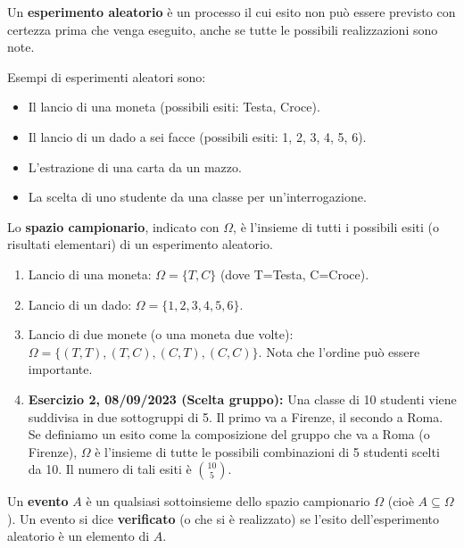 \documentclass[12pt,a4paper]{article}
\begin{document}
\begin{definition}
Un \textbf{esperimento aleatorio} è un processo il cui esito non può essere previsto con certezza prima che venga eseguito, anche se tutte le possibili realizzazioni sono note.
\end{definition}

\begin{example}
Esempi di esperimenti aleatori sono:
\begin{itemize}
    \item Il lancio di una moneta (possibili esiti: Testa, Croce).
    \item Il lancio di un dado a sei facce (possibili esiti: 1, 2, 3, 4, 5, 6).
    \item L'estrazione di una carta da un mazzo.
    \item La scelta di uno studente da una classe per un'interrogazione.
\end{itemize}
\end{example}

\begin{definition}
Lo \textbf{spazio campionario}, indicato con $\Omega$, è l'insieme di tutti i possibili esiti (o risultati elementari) di un esperimento aleatorio.
\end{definition}

\begin{example}
\begin{enumerate}
    \item Lancio di una moneta: $\Omega = \{T, C\}$ (dove T=Testa, C=Croce).
    \item Lancio di un dado: $\Omega = \{1, 2, 3, 4, 5, 6\}$.
    \item Lancio di due monete (o una moneta due volte): $\Omega = \{(T,T), (T,C), (C,T), (C,C)\}$. Nota che l'ordine può essere importante.
    \item \textbf{Esercizio 2, 08/09/2023 (Scelta gruppo):} Una classe di 10 studenti viene suddivisa in due sottogruppi di 5. Il primo va a Firenze, il secondo a Roma. Se definiamo un esito come la composizione del gruppo che va a Roma (o Firenze), $\Omega$ è l'insieme di tutte le possibili combinazioni di 5 studenti scelti da 10. Il numero di tali esiti è $\binom{10}{5}$.
\end{enumerate}
\end{example}

\begin{definition}[Evento]
Un \textbf{evento} $A$ è un qualsiasi sottoinsieme dello spazio campionario $\Omega$ (cioè $A \subseteq \Omega$). Un evento si dice \textbf{verificato} (o che si è realizzato) se l'esito dell'esperimento aleatorio è un elemento di $A$.
\end{definition}
\end{document}

